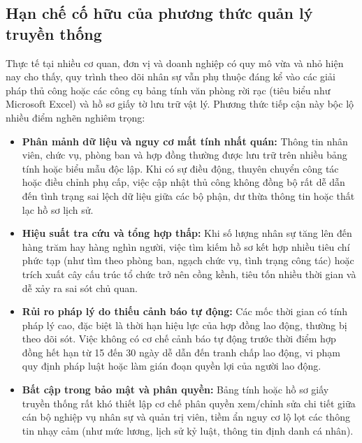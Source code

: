 \documentclass[12pt,a4paper]{report}
\begin{document}
\subsection*{Hạn chế cố hữu của phương thức quản lý truyền thống}
Thực tế tại nhiều cơ quan, đơn vị và doanh nghiệp có quy mô vừa và nhỏ hiện nay cho thấy, quy trình theo dõi nhân sự vẫn phụ thuộc đáng kể vào các giải pháp thủ công hoặc các công cụ bảng tính văn phòng rời rạc (tiêu biểu như Microsoft Excel) và hồ sơ giấy tờ lưu trữ vật lý. Phương thức tiếp cận này bộc lộ nhiều điểm nghẽn nghiêm trọng:
\begin{itemize}[leftmargin=1.0cm]
    \item \textbf{Phân mảnh dữ liệu và nguy cơ mất tính nhất quán:} Thông tin nhân viên, chức vụ, phòng ban và hợp đồng thường được lưu trữ trên nhiều bảng tính hoặc biểu mẫu độc lập. Khi có sự điều động, thuyên chuyển công tác hoặc điều chỉnh phụ cấp, việc cập nhật thủ công không đồng bộ rất dễ dẫn đến tình trạng sai lệch dữ liệu giữa các bộ phận, dư thừa thông tin hoặc thất lạc hồ sơ lịch sử.
    \item \textbf{Hiệu suất tra cứu và tổng hợp thấp:} Khi số lượng nhân sự tăng lên đến hàng trăm hay hàng nghìn người, việc tìm kiếm hồ sơ kết hợp nhiều tiêu chí phức tạp (như tìm theo phòng ban, ngạch chức vụ, tình trạng công tác) hoặc trích xuất cây cấu trúc tổ chức trở nên cồng kềnh, tiêu tốn nhiều thời gian và dễ xảy ra sai sót chủ quan.
    \item \textbf{Rủi ro pháp lý do thiếu cảnh báo tự động:} Các mốc thời gian có tính pháp lý cao, đặc biệt là thời hạn hiệu lực của hợp đồng lao động, thường bị theo dõi sót. Việc không có cơ chế cảnh báo tự động trước thời điểm hợp đồng hết hạn từ 15 đến 30 ngày dễ dẫn đến tranh chấp lao động, vi phạm quy định pháp luật hoặc làm gián đoạn quyền lợi của người lao động.
    \item \textbf{Bất cập trong bảo mật và phân quyền:} Bảng tính hoặc hồ sơ giấy truyền thống rất khó thiết lập cơ chế phân quyền xem/chỉnh sửa chi tiết giữa cán bộ nghiệp vụ nhân sự và quản trị viên, tiềm ẩn nguy cơ lộ lọt các thông tin nhạy cảm (như mức lương, lịch sử kỷ luật, thông tin định danh cá nhân).
\end{itemize}
\end{document}
